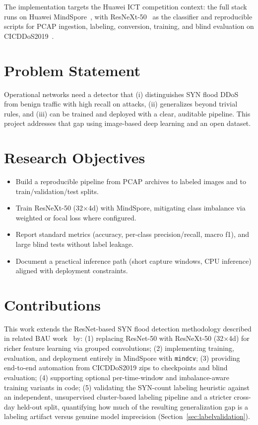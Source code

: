 The implementation targets the Huawei ICT competition context: the full stack
runs on Huawei MindSpore~\cite{mindspore2020}, with ResNeXt-50~\cite{xie2017aggregated}
as the classifier and reproducible scripts for PCAP ingestion, labeling,
conversion, training, and blind evaluation on CICDDoS2019~\cite{cic2019ddos}.

\section{Problem Statement}
Operational networks need a detector that (i) distinguishes SYN flood DDoS from
benign traffic with high recall on attacks, (ii) generalizes beyond trivial
rules, and (iii) can be trained and deployed with a clear, auditable pipeline.
This project addresses that gap using image-based deep learning and an open
dataset.

\section{Research Objectives}
\begin{itemize}
    \item Build a reproducible pipeline from PCAP archives to labeled images and to train/validation/test splits.
    \item Train ResNeXt-50 (32$\times$4d) with MindSpore, mitigating class imbalance via weighted or focal loss where configured.
    \item Report standard metrics (accuracy, per-class precision/recall, macro \gls{f1}), and large blind tests without label leakage.
    \item Document a practical inference path (short capture windows, CPU inference) aligned with deployment constraints.
\end{itemize}

\section{Contributions}
This work extends the ResNet-based SYN flood detection methodology described in
related BAU work~\cite{bazzi2022resnet} by: (1) replacing ResNet-50 with
ResNeXt-50 (32$\times$4d) for richer feature learning via grouped convolutions;
(2) implementing training, evaluation, and deployment entirely in MindSpore with
\texttt{mindcv}; (3) providing end-to-end automation from CICDDoS2019 zips to
checkpoints and blind evaluation; (4) supporting optional per-time-window and
imbalance-aware training variants in code; (5) validating the SYN-count
labeling heuristic against an independent, unsupervised cluster-based
labeling pipeline and a stricter cross-day held-out split, quantifying how
much of the resulting generalization gap is a labeling artifact versus
genuine model imprecision (Section~\ref{sec:labelvalidation}).

